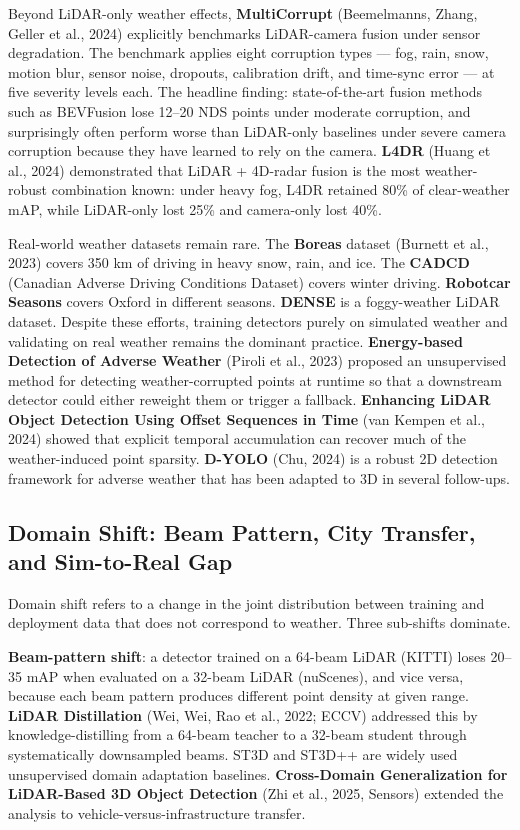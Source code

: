 Beyond LiDAR-only weather effects, \textbf{MultiCorrupt} (Beemelmanns, Zhang, Geller et al., 2024) explicitly benchmarks LiDAR-camera fusion under sensor degradation. The benchmark applies eight corruption types --- fog, rain, snow, motion blur, sensor noise, dropouts, calibration drift, and time-sync error --- at five severity levels each. The headline finding: state-of-the-art fusion methods such as BEVFusion lose 12--20 NDS points under moderate corruption, and surprisingly often perform worse than LiDAR-only baselines under severe camera corruption because they have learned to rely on the camera. \textbf{L4DR} (Huang et al., 2024) demonstrated that LiDAR + 4D-radar fusion is the most weather-robust combination known: under heavy fog, L4DR retained 80\% of clear-weather mAP, while LiDAR-only lost 25\% and camera-only lost 40\%.

Real-world weather datasets remain rare. The \textbf{Boreas} dataset (Burnett et al., 2023) covers 350 km of driving in heavy snow, rain, and ice. The \textbf{CADCD} (Canadian Adverse Driving Conditions Dataset) covers winter driving. \textbf{Robotcar Seasons} covers Oxford in different seasons. \textbf{DENSE} is a foggy-weather LiDAR dataset. Despite these efforts, training detectors purely on simulated weather and validating on real weather remains the dominant practice. \textbf{Energy-based Detection of Adverse Weather} (Piroli et al., 2023) proposed an unsupervised method for detecting weather-corrupted points at runtime so that a downstream detector could either reweight them or trigger a fallback. \textbf{Enhancing LiDAR Object Detection Using Offset Sequences in Time} (van Kempen et al., 2024) showed that explicit temporal accumulation can recover much of the weather-induced point sparsity. \textbf{D-YOLO} (Chu, 2024) is a robust 2D detection framework for adverse weather that has been adapted to 3D in several follow-ups.

\subsection{Domain Shift: Beam Pattern, City Transfer, and Sim-to-Real Gap}\label{domain-shift-beam-pattern-city-transfer-and-sim-to-real-gap}

Domain shift refers to a change in the joint distribution between training and deployment data that does not correspond to weather. Three sub-shifts dominate.

\textbf{Beam-pattern shift}: a detector trained on a 64-beam LiDAR (KITTI) loses 20--35 mAP when evaluated on a 32-beam LiDAR (nuScenes), and vice versa, because each beam pattern produces different point density at given range. \textbf{LiDAR Distillation} (Wei, Wei, Rao et al., 2022; ECCV) addressed this by knowledge-distilling from a 64-beam teacher to a 32-beam student through systematically downsampled beams. ST3D and ST3D++ are widely used unsupervised domain adaptation baselines. \textbf{Cross-Domain Generalization for LiDAR-Based 3D Object Detection} (Zhi et al., 2025, Sensors) extended the analysis to vehicle-versus-infrastructure transfer.

